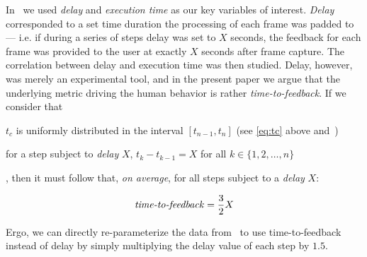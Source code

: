 In~\cite{olguinmunoz:impact2021} we used \emph{delay} and \emph{execution time} as our key variables of interest.
\emph{Delay} corresponded to a set time duration the processing of each frame was padded to --- i.e. if during a series of steps delay was set to \( X \) seconds, the feedback for each frame was provided to the user at exactly \( X \) seconds after frame capture.
The correlation between delay and execution time was then studied.
Delay, however, was merely an experimental tool, and in the present paper we argue that the underlying metric driving the human behavior is rather \emph{time-to-feedback}.
If we consider that
\begin{enumerate*}[itemjoin={{; }}, itemjoin={{; and }}]
    \item \( t_c \) is uniformly distributed in the interval \( [t_{n - 1}, t_{n}] \) (see \cref{eq:tc} above and~\cite{olguinmunoz:impact2021})
    \item for a step subject to \emph{delay} \( X \), \( t_k - t_{k - 1} = X \) for all \( k \in \{1, 2, \ldots, n\} \)
\end{enumerate*},
then it must follow that, \emph{on average}, for all steps subject to a \emph{delay} \( X \):

\begin{equation}\label{eq:ttf}
    \text{\emph{time-to-feedback}} = \frac{3}{2}X
\end{equation}

Ergo, we can directly re-parameterize the data from~\cite{olguinmunoz:impact2021} to use time-to-feedback instead of delay by simply multiplying the delay value of each step by \( 1.5 \).

